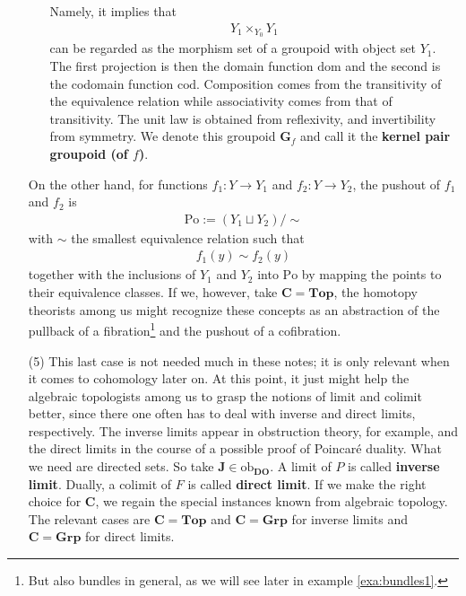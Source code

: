 \begin{exa}
\begin{enumerate}
\begin{enumerate}
Namely, it implies that
\begin{align*}
  Y_{1}
  \times_{Y_{0}}
  Y_{1}
\end{align*}
can be regarded as the morphism set of a groupoid with object set $Y_{1}$.
The first projection is then the domain function $\mathrm{dom}$ and the second is the codomain function $\mathrm{cod}$.
Composition comes from the transitivity of the equivalence relation while associativity comes from that of transitivity.
The unit law is obtained from reflexivity, and invertibility from symmetry.
We denote this groupoid $\mathbf{G}_{f}$ and call it the \textbf{kernel pair groupoid (of $f$)}.
\end{enumerate}
On the other hand, for functions $f_{1} \colon Y \rightarrow Y_{1}$ and $f_{2} \colon Y \rightarrow Y_{2}$, the pushout of $f_{1}$ and $f_{2}$ is
\begin{align*}
  \mathrm{Po}
  :=
  \left(
    Y_{1}
    \sqcup
    Y_{2}
  \right)
  \slash
  \sim
\end{align*}
with $\sim$ the smallest equivalence relation such that
\begin{align*}
  f_{1}(y)
  \sim
  f_{2}(y)
\end{align*}
together with the inclusions of $Y_{1}$ and $Y_{2}$ into $\mathrm{Po}$ by mapping the points to their equivalence classes.
If we, however, take $\mathbf{C} = \mathbf{Top}$, the homotopy theorists among us might recognize these concepts as an abstraction of the pullback of a fibration\footnote{But also bundles in general, as we will see later in example \ref{exa:bundles1}.} and the pushout of a cofibration.
\item[(5)]
This last case is not needed much in these notes; it is only relevant when it comes to cohomology later on.
At this point, it just might help the algebraic topologists among us to grasp the notions of limit and colimit better, since there one often has to deal with inverse and direct limits, respectively.
The inverse limits appear in obstruction theory, for example, and the direct limits in the course of a possible proof of Poincar{\'e} duality.
What we need are directed sets.
So take $\mathbf{J} \in \mathrm{ob}_{\mathbf{DO}}$.
A limit of $P$ is called \textbf{inverse limit}.
Dually, a colimit of $F$ is called \textbf{direct limit}.
If we make the right choice for $\mathbf{C}$, we regain the special instances known from algebraic topology.
The relevant cases are $\mathbf{C} = \mathbf{Top}$ and $\mathbf{C} = \mathbf{Grp}$ for inverse limits and $\mathbf{C} = \mathbf{Grp}$ for direct limits.
\end{enumerate}
\end{exa}
